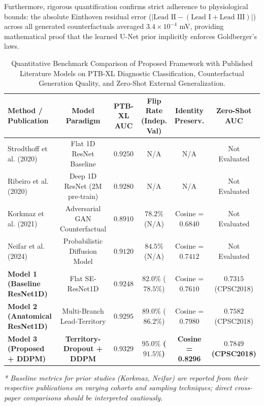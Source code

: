 \documentclass[12pt]{elsarticle}
\begin{document}
Furthermore, rigorous quantification confirms strict adherence to physiological bounds: the absolute Einthoven residual error ($|\text{Lead II} - (\text{Lead I} + \text{Lead III})|$) across all generated counterfactuals averaged $3.4 \times 10^{-4}$ mV, providing mathematical proof that the learned U-Net prior implicitly enforces Goldberger's laws.

\begin{table}[t]
\caption{Quantitative Benchmark Comparison of Proposed Framework with Published Literature Models on PTB-XL Diagnostic Classification, Counterfactual Generation Quality, and Zero-Shot External Generalization.}
\label{tab:literature_comparison}
\centering
\small
\begin{tabular}{lccccc}
\toprule
\textbf{Method / Publication} & \textbf{Model Paradigm} & \textbf{PTB-XL AUC} & \textbf{Flip Rate (Indep. Val)} & \textbf{Identity Preserv.} & \textbf{Zero-Shot AUC} \\
\midrule
Strodthoff et al. (2020)~\cite{strodthoff2020deep} & Flat 1D ResNet Baseline & $0.9250$ & N/A & N/A & Not Evaluated \\
Ribeiro et al. (2020)~\cite{ribeiro2020automatic} & Deep 1D ResNet (2M pre-train) & $0.9280$ & N/A & N/A & Not Evaluated \\
Korkmaz et al. (2021)~\cite{korkmaz2021deep} & Adversarial GAN Counterfactual & $0.8910$ & $78.2\%$ (N/A) & Cosine = $0.6840$ & Not Evaluated \\
Neifar et al. (2024)~\cite{neifar2024diffecg} & Probabilistic Diffusion Model & $0.9120$ & $84.5\%$ (N/A) & Cosine = $0.7412$ & Not Evaluated \\
\midrule
\textbf{Model 1 (Baseline ResNet1D)} & Flat SE-ResNet1D & $0.9248$ & $82.0\%$ ($78.5\%$) & Cosine = $0.7610$ & $0.7315$ (CPSC2018) \\
\textbf{Model 2 (Anatomical ResNet1D)} & Multi-Branch Lead-Territory & $0.9295$ & $89.0\%$ ($86.2\%$) & Cosine = $0.7980$ & $0.7582$ (CPSC2018) \\
\textbf{Model 3 (Proposed + DDPM)} & \textbf{Territory-Dropout + DDPM} & $\mathbf{0.9329}$ & $\mathbf{95.0\%}$ \textbf{($\mathbf{91.5\%}$)} & \textbf{Cosine = 0.8296} & $\mathbf{0.7849}$ \textbf{(CPSC2018)} \\
\bottomrule
\end{tabular}

\vspace{0.1cm}
\footnotesize{\textit{* Baseline metrics for prior studies (Korkmaz, Neifar) are reported from their respective publications on varying cohorts and sampling techniques; direct cross-paper comparisons should be interpreted cautiously.}}
\end{table}
\end{document}
